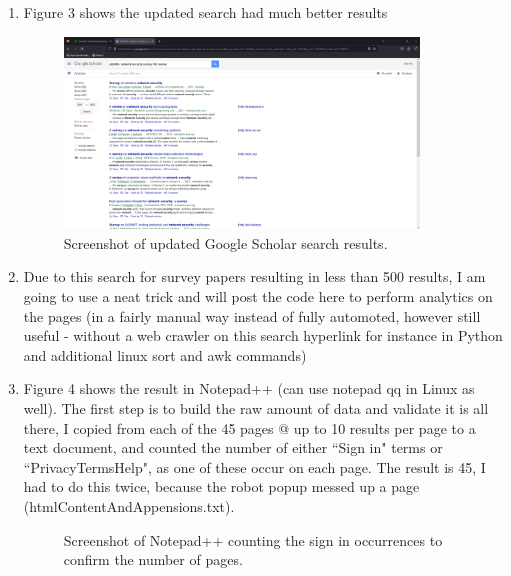 \documentclass{article}
\begin{document}
\begin{enumerate}
\begin{figure}[ht!]
                \end{figure}
            \item Figure 3 shows the updated search had much better results 
                \begin{figure}[ht!] %
                \centering
                \caption{\label{fig:TableOfContentsSnippet.png}Screenshot of updated Google Scholar search results.}
                \includegraphics[width=0.89\textwidth, height=0.5\textwidth]{2023-09-10 14 24 37.png}
                \end{figure}
            \item Due to this search for survey papers resulting in less than 500 results, I am going to use a neat trick and will post the code here to perform analytics on the pages (in a fairly manual way instead of fully automoted, however still useful - without a web crawler on this search hyperlink for instance in Python and additional linux sort and awk commands)
            \item Figure 4 shows the result in Notepad++ (can use notepad qq in Linux as well). The first step is to build the raw amount of data and validate it is all there, I copied from each of the 45 pages @ up to 10 results per page to a text document, and counted the number of either ``Sign in" terms or ``PrivacyTermsHelp", as one of these occur on each page. The result is 45, I had to do this twice, because the robot popup messed up a page (htmlContentAndAppensions.txt).
                \begin{figure}[ht!] %
                \centering
                \caption{\label{fig:TableOfContentsSnippet.png}Screenshot of Notepad++ counting the sign in occurrences to confirm the number of pages.}

\end{figure}
\end{enumerate}
\end{document}
